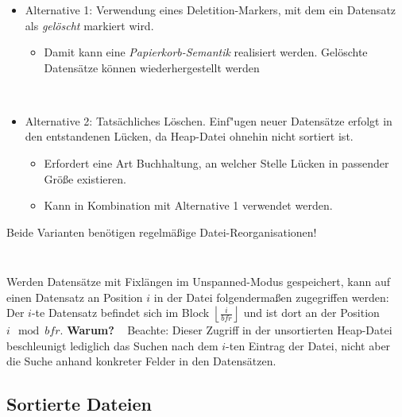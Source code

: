 \begin{frame}
\frametitle{\insertsection}
\framesubtitle{\insertsubsection}
\begin{itemize}
\item Alternative 1: Verwendung eines Deletition-Markers, mit dem ein Datensatz als \textit{gel\"oscht} markiert wird.
\begin{itemize}
	\item Damit kann eine \textit{Papierkorb-Semantik} realisiert werden. Gel\"oschte Datens\"atze k\"onnen wiederhergestellt werden
\end{itemize}
\pause
\ \\[4pt]
\item Alternative 2: Tats\"achliches L\"oschen. Einf"ugen neuer Datens\"atze erfolgt in den entstandenen L\"ucken, 
da Heap-Datei ohnehin nicht sortiert ist.
\begin{itemize}
	\item Erfordert eine Art Buchhaltung, an welcher Stelle L\"ucken in passender Größe existieren.
	\item Kann in Kombination mit Alternative 1 verwendet werden.
\end{itemize} 
\end{itemize}
\abs
\pause
\alert{Beide Varianten benötigen regelmäßige Datei-Reorganisationen!}
\end{frame}

\begin{frame}
\frametitle{\insertsection}
\framesubtitle{\insertsubsection}
\\[4pt]
Werden Datens\"atze mit Fixl\"angen im Unspanned-Modus gespeichert, kann auf einen Datensatz an Position $i$ in der Datei 
folgenderma\ss en zugegriffen werden: 
\abs
Der $i$-te Datensatz befindet sich im Block $\left \lfloor\frac{i}{bfr}\right\rfloor$ und ist dort an der Position $i\mod bfr$. 
\textbf{Warum?}
\abs\ \abs
\pause
\alert{Beachte: Dieser Zugriff in der unsortierten Heap-Datei beschleunigt lediglich das Suchen nach dem 
	$i$-ten Eintrag der Datei, nicht aber die Suche anhand konkreter Felder in den Datens\"atzen.}
\end{frame}

\subsection{Sortierte Dateien}

